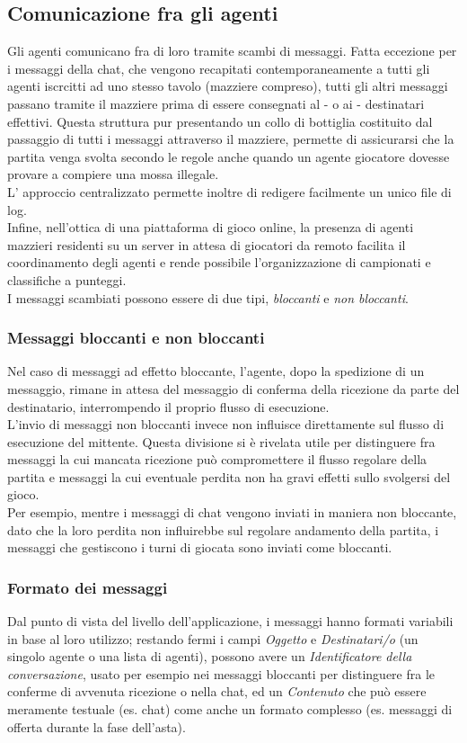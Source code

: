 \subsection{Comunicazione fra gli agenti}

Gli agenti comunicano fra di loro tramite scambi di messaggi.
Fatta eccezione per i messaggi della chat, che vengono recapitati contemporaneamente a tutti gli agenti iscrcitti ad uno stesso tavolo (mazziere compreso), tutti gli altri messaggi passano tramite il mazziere prima di essere consegnati al - o ai - destinatari effettivi.
Questa struttura pur presentando un collo di bottiglia costituito dal passaggio di tutti i messaggi attraverso il mazziere, permette di assicurarsi che la partita venga svolta secondo le regole anche quando un agente giocatore dovesse provare a compiere una mossa illegale.\\
L' approccio centralizzato permette inoltre di redigere facilmente un unico file di log.\\
Infine, nell'ottica di una piattaforma di gioco online, la presenza di agenti mazzieri residenti su un server in attesa di giocatori da remoto facilita il coordinamento degli agenti e rende possibile l'organizzazione di campionati e classifiche a punteggi.\\
I messaggi scambiati possono essere di due tipi, \emph{bloccanti} e \emph{non bloccanti}.\\

\subsubsection*{Messaggi bloccanti e non bloccanti}

Nel caso di messaggi ad effetto bloccante, l'agente, dopo la spedizione di un messaggio, rimane in attesa del messaggio di conferma della ricezione da parte del destinatario, interrompendo il proprio flusso di esecuzione.\\
L'invio di messaggi non bloccanti invece non influisce direttamente sul flusso di esecuzione del mittente.
Questa divisione si è rivelata utile per distinguere fra messaggi la cui mancata ricezione può compromettere il flusso regolare della partita e messaggi la cui eventuale perdita non ha gravi effetti sullo svolgersi del gioco.\\
Per esempio, mentre i messaggi di chat vengono inviati in maniera non bloccante, dato che la loro perdita non influirebbe sul regolare andamento della partita, i messaggi che gestiscono i turni di giocata sono inviati come bloccanti.


\subsubsection*{Formato dei messaggi}
Dal punto di vista del livello dell'applicazione, i messaggi hanno formati variabili in base al loro utilizzo; restando fermi i campi \emph{Oggetto} e \emph{Destinatari/o} (un singolo agente o una lista di agenti), possono avere un \emph{Identificatore della conversazione}, usato per esempio nei messaggi bloccanti per distinguere fra le conferme di avvenuta ricezione o nella chat, ed un \emph{Contenuto} che può essere meramente testuale (es. chat) come anche un formato complesso (es. messaggi di offerta durante la fase dell'asta).
